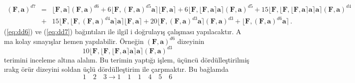 \documentclass[a4paper,10pt]{article}
\begin{document}
\begin{eqnarray}
 \left(\mathbf{F},\mathbf{a}\right)^{d7} &=&
 \lfloor \mathbf{F} , \mathbf{a} \rceil
 \left(\mathbf{F},\mathbf{a}\right)^{d6}
 + 6 \lfloor \mathbf{F} , 
 \left(\mathbf{F},\mathbf{a}\right)^{d5}\mathbf{a} \rceil
 \lfloor \mathbf{F} , \mathbf{a} \rceil 
 + 6 \lfloor \mathbf{F} , 
 \lfloor \mathbf{F} , \mathbf{a} \rceil \mathbf{a} \rceil
 \left(\mathbf{F},\mathbf{a}\right)^{d5}
 + 15  \lfloor \mathbf{F} ,  
 \lfloor \mathbf{F} , \lfloor \mathbf{F} 
 , \mathbf{a} \rceil \mathbf{a} \rceil \mathbf{a} \rceil 
 \left(\mathbf{F},\mathbf{a}\right)^{d4} \nonumber\\
 &+& 15  \lfloor \mathbf{F} ,  
 \lfloor \mathbf{F} , 
 \left(\mathbf{F},\mathbf{a}\right)^{d4}\mathbf{a} 
 \rceil\mathbf{a} \rceil 
 \lfloor \mathbf{F} , \mathbf{a} \rceil
 + 20 \lfloor \mathbf{F} , 
 \left(\mathbf{F},\mathbf{a}\right)^{d3}\mathbf{a} \rceil
 \left(\mathbf{F},\mathbf{a}\right)^{d3}
 +  \lfloor \mathbf{F} , 
 \left(\mathbf{F},\mathbf{a}\right)^{d6}\mathbf{a} \rceil \, .
 \label{eq:dd7}
\end{eqnarray}
(\ref{eq:dd6}) ve (\ref{eq:dd7}) ba\u{g}\i nt\i lar{\i} ile ilgil%
i do\u{g}rulay\i \c{s} \c{c}al\i \c{s}mas{\i} yap\i lacakt\i r. A%
ma kolay s\i nay\i \c{s}lar hemen yap\i labilir. \"Or\-ne\u{g}in %
$\left(\mathbf{F},\mathbf{a}\right)^{d6}$ dizeyinin %
\begin{equation}
10  \lfloor \mathbf{F} ,  \lfloor \mathbf{F} , \lfloor \mathbf{F} 
 , \mathbf{a} \rceil \mathbf{a} \rceil \mathbf{a} \rceil 
 \left(\mathbf{F},\mathbf{a}\right)^{d3}                                                                     
\end{equation}
terimini inceleme alt\i na alal\i m. Bu terimin yapt\i \u{g}{\i} %
i\c{s}lem, \"u\c{c}\"unc\"u d\"ord\"ulle\c{s}tirilmi\c{s} \i rakg%
\"or\"ur dizeyini soldan \"u\c{c}l\"u d\"ord\"ulle\c{s}tirim ile %
\c{c}arpmakt\i r. Bu ba\u{g}lamda %
\begin{equation}
  1\quad 2\quad 3 \rightarrow 1\quad 1\quad 1\quad 4\quad 5\quad 6
\end{equation}
\end{document}
